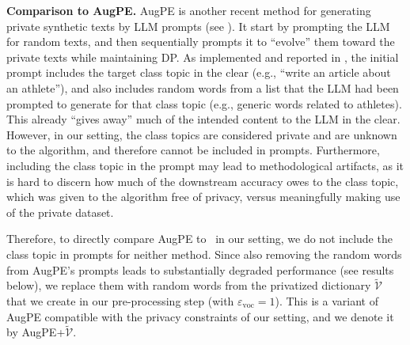 \noindent\textbf{Comparison to AugPE.} 
AugPE \cite{api2} is another recent method for generating private synthetic texts by LLM prompts (see ). It start by prompting the LLM for random texts, and then sequentially prompts it to ``evolve'' them toward the private texts while maintaining DP.  
As implemented and reported in \cite{api2}, the initial prompt includes the target class topic in the clear (e.g., ``write an article about an athlete''), and also includes random words from a list that the LLM had been prompted to generate for that class topic (e.g., generic words related to athletes). 
This already ``gives away'' much of the intended content to the LLM in the clear.
However, in our setting, the class topics are considered private and are unknown to the algorithm, and therefore cannot be included in prompts. Furthermore, including the class topic in the prompt may lead to methodological artifacts, as it is hard to discern how much of the downstream accuracy owes to the class topic, which was given to the algorithm free of privacy, versus meaningfully making use of the private dataset. 

Therefore, to directly compare AugPE to \alg\ in our setting, we do not include the class topic in prompts for neither method. Since also removing the random words from AugPE's prompts leads to substantially degraded performance (see results below), we replace them  with random words from the privatized dictionary $\widetilde{\mathcal{V}}$ that we create in our pre-processing step (with $\varepsilon_{\mathrm{voc}}=1$). 
This is a variant of AugPE compatible with the privacy constraints of our setting, and we denote it by AugPE+$\widetilde{\mathcal{V}}$.

